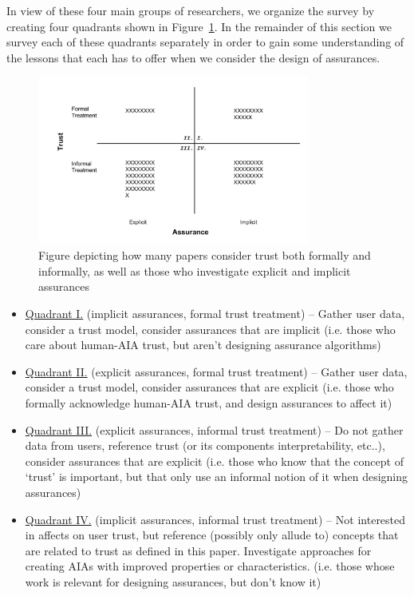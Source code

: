 In view of these four main groups of researchers, we organize the survey by creating four quadrants shown in Figure~\ref{fig:trust_assurance_intention}. In the remainder of this section we survey each of these quadrants separately in order to gain some understanding of the lessons that each has to offer when we consider the design of assurances.

\begin{figure}[htbp]
    \centering
    \includegraphics[width=0.8\textwidth]{Figures/Trust_vs_Assurance_Intention.pdf}
    \caption{Figure depicting how many papers consider trust both formally and informally, as well as those who investigate explicit and implicit assurances}
    \label{fig:trust_assurance_intention}
\end{figure}

\begin{itemize}
    \item \hyperref[sec:q1]{Quadrant I.} (implicit assurances, formal trust treatment) -- Gather user data, consider a trust model, consider assurances that are implicit (i.e. those who care about human-AIA trust, but aren't designing assurance algorithms)
    \item \hyperref[sec:q2]{Quadrant II.} (explicit assurances, formal trust treatment) -- Gather user data, consider a trust model, consider assurances that are explicit (i.e. those who formally acknowledge human-AIA trust, and design assurances to affect it)
    \item \hyperref[sec:q3]{Quadrant III.} (explicit assurances, informal trust treatment) -- Do not gather data from users, reference trust (or its components interpretability, etc..), consider assurances that are explicit (i.e. those who know that the concept of `trust' is important, but that only use an informal notion of it when designing assurances)
    \item \hyperref[sec:q4]{Quadrant IV.} (implicit assurances, informal trust treatment) -- Not interested in affects on user trust, but reference (possibly only allude to) concepts that are related to trust as defined in this paper. Investigate approaches for creating AIAs with improved properties or characteristics. (i.e. those whose work is relevant for designing assurances, but don't know it)
\end{itemize}





